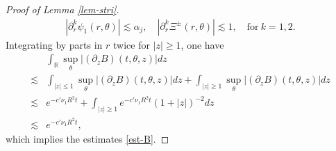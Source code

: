 \documentclass[12pt]{article}
\numberwithin{equation}{section}
\begin{document}
\begin{proof}[Proof of Lemma \ref{lem-stri}]
  	\begin{align*}
  		|\partial_r^k\psi_1(r,\theta)|\lesssim \alpha_j,\quad |\partial_r^k\Xi^{\pm}(r,\theta)|\lesssim1,\quad \mathrm{for}\ k=1,2.
  	\end{align*}
  	Integrating by parts in $r$ twice for $|z|\geq1$, one have
  	\begin{align*}
  		&\int_{\mathbb{R}}\sup_{\theta}|(\partial_zB)(t,\theta,z)|dz\\
  		\lesssim&\int_{|z|\leq1}\sup_{\theta}|(\partial_zB)(t,\theta,z)|dz+
  		\int_{|z|\geq1}\sup_{\theta}|(\partial_zB)(t,\theta,z)|dz\\
        \lesssim&e^{-c'\nu_1R^2t}+
  		\int_{|z|\geq1}e^{-c'\nu_1R^2t}(1+|z|)^{-2}dz\\
  		\lesssim&  e^{-c'\nu_1R^2t},
  	\end{align*}
    which implies the estimates \eqref{est-B}. 
  	

\end{proof}
\end{document}

